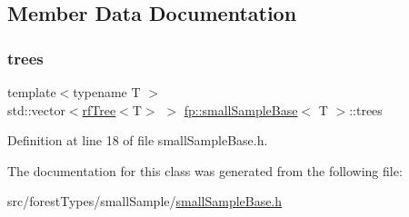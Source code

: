 \subsection{Member Data Documentation}
\mbox{\label{classfp_1_1smallSampleBase_a9a3d92948248f1809d9f025b553512b6}} 
\subsubsection{\texorpdfstring{trees}{trees}}
{\footnotesize\ttfamily template$<$typename T $>$ \\
std\+::vector$<$\hyperlink{classfp_1_1rfTree}{rf\+Tree}$<$T$>$ $>$ \hyperlink{classfp_1_1smallSampleBase}{fp\+::small\+Sample\+Base}$<$ T $>$\+::trees\hspace{0.3cm}{\ttfamily [protected]}}



Definition at line 18 of file small\+Sample\+Base.\+h.



The documentation for this class was generated from the following file\+:\begin{DoxyCompactItemize}
\item 
src/forest\+Types/small\+Sample/\hyperlink{smallSampleBase_8h}{small\+Sample\+Base.\+h}\end{DoxyCompactItemize}
